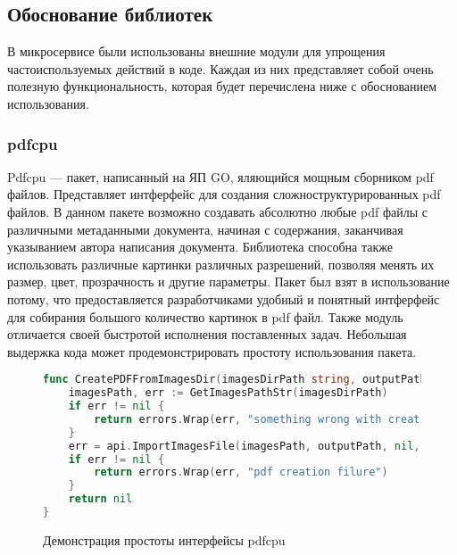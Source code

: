 \subsection{Обоснование библиотек}

В микросервисе были использованы внешние модули для упрощения частоиспользуемых действий в коде.
Каждая из них представляет собой очень полезную функциональность, которая будет перечислена ниже с обоснованием использования.

\subsubsection{pdfcpu}
Pdfcpu \cite{pdfcpu-cite} --- пакет, написанный на ЯП GO, яляющийся мощным сборником pdf файлов. Представляет интферфейс для создания сложноструктурированных pdf файлов.
В данном пакете возможно создавать абсолютно любые pdf файлы с различными метаданными документа, начиная с содержания, заканчивая указыванием автора написания документа.
Библиотека способна также использовать различные картинки различных разрешений, позволяя менять их размер, цвет, прозрачность и другие параметры.
Пакет был взят в использование потому, что предоставляется разработчиками удобный и понятный интферфейс для собирания большого количество картинок в pdf файл. 
Также модуль отличается своей быстротой исполнения поставленных задач. Небольшая выдержка кода может продемонстрировать простоту использования пакета.

\begin{figure}
\begin{lstlisting}[language=go]
func CreatePDFFromImagesDir(imagesDirPath string, outputPath string) error {
	imagesPath, err := GetImagesPathStr(imagesDirPath)
	if err != nil {
		return errors.Wrap(err, "something wrong with creating images path")
	}
	err = api.ImportImagesFile(imagesPath, outputPath, nil, nil)
	if err != nil {
		return errors.Wrap(err, "pdf creation filure")
	}
	return nil
}
\end{lstlisting}
\caption{Демонстрация простоты интерфейсы pdfcpu}
\label{libs-pdfcpu}
\end{figure}